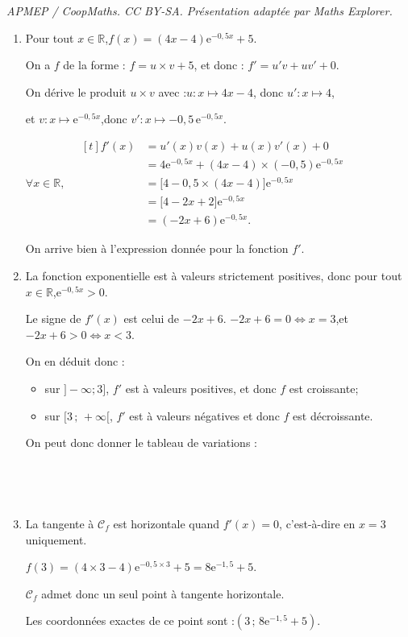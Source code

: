 \documentclass[10pt]{article}
\providecommand{\R}{\mathbb{R}}
\providecommand{\e}{{\mathrm{e}}}
\begin{document}
\noindent\textit{APMEP / CoopMaths. CC BY-SA. Présentation adaptée par Maths Explorer.}\par\medskip
\begin{enumerate}
		\item Pour tout $x\in\R$,\quad $f(x)=(4x-4)\e^{-0,5x}+5$.

		On a $f$ de la forme : \quad $f = u \times v + 5$, \quad et donc : $f'=u'v + uv' + 0$.

		On dérive le produit $u\times v$ avec :\quad $u : x\longmapsto 4x-4$, \quad donc \quad $u': x \longmapsto 4$,

		et \quad $v : x\longmapsto \e^{-0,5x}$,\quad donc \quad $v':x\longmapsto -0,5\,\e^{-0,5x}$.

		$\forall x \in \R,\quad \begin{aligned}[t]
			f'(x)&=u'(x)v(x)+u(x)v'(x) + 0\\
			&=4\e^{-0,5x}+(4x-4)\times(-0,5)\e^{-0,5x}\\
			&=\big[4-0,5\times(4x-4)\big]\e^{-0,5x}\\
			&=\big[4-2x+2\big]\e^{-0,5x}\\
			&=(-2x+6)\e^{-0,5x}.
		\end{aligned}$

		On arrive bien à l'expression donnée pour la fonction $f'$.

		\item La fonction exponentielle est à valeurs strictement positives, donc pour tout $x\in\R$,\quad $\e^{-0,5x}>0$.

		Le signe de $f'(x)$ est celui de $-2x+6$.
		$-2x+6=0\Longleftrightarrow x=3$,\quad et \quad $-2x+6>0\Longleftrightarrow x<3$.

		On en déduit donc :
		\begin{itemize}[left=5mm,label={\textbullet~} ]
			\item sur $]-\infty ; 3]$, $f'$ est à valeurs positives, et donc $f$ est croissante;

			\item sur $[3\,;\,+\infty[$, $f'$ est à valeurs négatives et donc $f$ est décroissante.
		\end{itemize}

		On peut donc donner le tableau de variations :

		\hfill~\hfill~

		\item La tangente à $\mathcal{C}_{f}$ est horizontale quand $f'(x)=0$, c'est-à-dire en $x=3$ uniquement.

		$f(3)=(4\times 3-4)\e^{-0,5\times 3}+5=8\e^{-1,5}+5$.

		$\mathcal{C}_{f}$ admet donc un seul point à tangente horizontale.

		Les coordonnées exactes de ce point sont :\quad $\left(3\,;\,8\e^{-1,5}+5\right)$.
	\end{enumerate}
\end{document}
